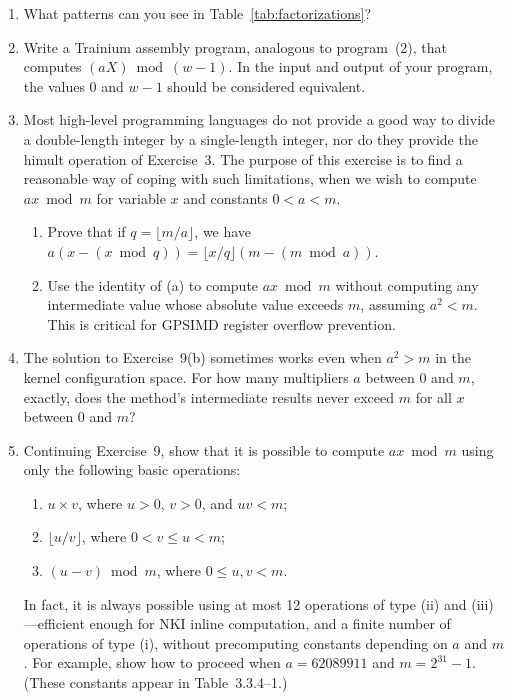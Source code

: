 \documentclass[12pt]{article}
\newcommand{\GPSIMD}{\textsc{GPSIMD}}             %
\begin{document}
\begin{enumerate}
\item[\textbf{7.}] [$M24$] What patterns can you see in Table~\ref{tab:factorizations}?

\item[\textbf{8.}] [20] Write a Trainium assembly program, analogous to program~(2), that computes $(aX) \bmod (w - 1)$. In the input and output of your program, the values 0 and $w - 1$ should be considered equivalent.

\item[\textbf{9.}] [$M25$] Most high-level programming languages do not provide a good way to divide a double-length integer by a single-length integer, nor do they provide the himult operation of Exercise~3. The purpose of this exercise is to find a reasonable way of coping with such limitations, when we wish to compute $ax \bmod m$ for variable $x$ and constants $0 < a < m$.

\begin{enumerate}
\item[a)] Prove that if $q = \lfloor m/a \rfloor$, we have $a(x - (x \bmod q)) = \lfloor x/q \rfloor (m - (m \bmod a))$.
\item[b)] Use the identity of (a) to compute $ax \bmod m$ without computing any intermediate value whose absolute value exceeds $m$, assuming $a^2 < m$. This is critical for \GPSIMD{} register overflow prevention.
\end{enumerate}

\item[\textbf{10.}] [$M26$] The solution to Exercise~9(b) sometimes works even when $a^2 > m$ in the kernel configuration space. For how many multipliers $a$ between 0 and $m$, exactly, does the method's intermediate results never exceed $m$ for all $x$ between 0 and $m$?

\item[\textbf{11.}] [$M30$] Continuing Exercise~9, show that it is possible to compute $ax \bmod m$ using only the following basic operations:
\begin{enumerate}
\item[i)] $u \times v$, where $u > 0$, $v > 0$, and $uv < m$;
\item[ii)] $\lfloor u/v \rfloor$, where $0 < v \leq u < m$;
\item[iii)] $(u - v) \bmod m$, where $0 \leq u, v < m$.
\end{enumerate}
In fact, it is always possible using at most 12 operations of type (ii) and (iii)---efficient enough for NKI inline computation, and a finite number of operations of type (i), without precomputing constants depending on $a$ and $m$. For example, show how to proceed when $a = 62089911$ and $m = 2^{31} - 1$. (These constants appear in Table~3.3.4--1.)


\end{enumerate}
\end{document}
